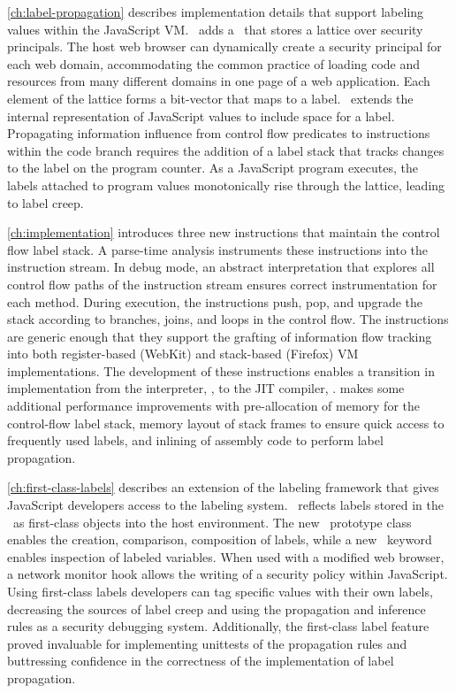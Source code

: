 \autoref{ch:label-propagation} describes implementation details that support labeling values within the JavaScript VM.
\FlowCore\ adds a \FlowLabelRegistry\ that stores a lattice over security principals.
The host web browser can dynamically create a security principal for each web domain, accommodating the common practice of loading code and resources from many different domains in one page of a web application.
Each element of the lattice forms a bit-vector that maps to a label.
\FlowCore\ extends the internal representation of JavaScript values to include space for a label.
Propagating information influence from control flow predicates to instructions within the code branch requires the addition of a label stack that tracks changes to the label on the program counter.
As a JavaScript program executes, the labels attached to program values monotonically rise through the lattice, leading to label creep.

\autoref{ch:implementation} introduces three new instructions that maintain the control flow label stack.
A parse-time analysis instruments these instructions into the instruction stream.
In debug mode, an abstract interpretation that explores all control flow paths of the instruction stream ensures correct instrumentation for each method.
During execution, the instructions push, pop, and upgrade the stack according to branches, joins, and loops in the control flow.
The instructions are generic enough that they support the grafting of information flow tracking into both register-based (WebKit) and stack-based (Firefox) VM implementations.
The development of these instructions enables a transition in implementation from the interpreter, \FlowCore, to the JIT compiler, \JitFlow.
\JitFlow makes some additional performance improvements with pre-allocation of memory for the control-flow label stack, memory layout of stack frames to ensure quick access to frequently used labels, and inlining of assembly code to perform label propagation.

\autoref{ch:first-class-labels} describes an extension of the labeling framework that gives JavaScript developers access to the labeling system.
\FlowCore\ reflects labels stored in the \FlowLabelRegistry\ as first-class objects into the host environment.
The new \FlowLabelObject\ prototype class enables the creation, comparison, composition of labels, while a new \mlabelof\ keyword enables inspection of labeled variables.
When used with a modified web browser, a network monitor hook allows the writing of a security policy within JavaScript.
Using first-class labels developers can tag specific values with their own labels, decreasing the sources of label creep and using the propagation and inference rules as a security debugging system.
Additionally, the first-class label feature proved invaluable for implementing unittests of the propagation rules and buttressing confidence in the correctness of the implementation of label propagation.

